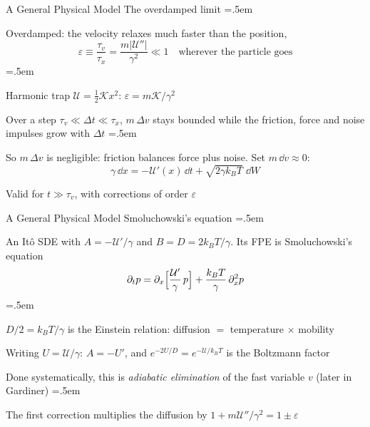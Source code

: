 \documentclass[xcolor={dvipsnames},t]{beamer}
\let\olditemize=\itemize
\let\endolditemize=\enditemize
\renewenvironment{itemize}{\olditemize \itemsep=.5em }{\endolditemize}
\newcommand{\cU}{\mathcal{U}}
\begin{document}
\begin{frame}{A General Physical Model}
    \alert{The overdamped limit}
    \begin{itemize}
        \item<2-> Overdamped: the velocity relaxes much faster than the position,
        \[ \varepsilon\equiv\frac{\tau_v}{\tau_x}=\frac{m|\cU''|}{\gamma^2}\ll1\quad\text{wherever the particle goes} \]
        \vspace{-1.5em}
        \begin{itemize}
            \item<3-> Harmonic trap $\cU=\tfrac12\mathcal Kx^2$: $\varepsilon=m\mathcal K/\gamma^2$
        \end{itemize}
        \item<4-> Over a step $\tau_v\ll\Delta t\ll\tau_x$, $m\,\Delta v$ stays bounded while the friction, force and noise impulses grow with $\Delta t$
        \begin{itemize}
            \item<5-> So $m\,\Delta v$ is negligible: friction balances force plus noise. Set $m\,\dd v\approx0$:
            \[ \gamma\,\dd x = -\cU'(x)\,\dd t + \sqrt{2\gamma k_BT}\;\dd W \]
        \end{itemize}
        \vspace{-1.5em}
        \item<6-> Valid for $t\gg\tau_v$, with corrections of order $\varepsilon$
    \end{itemize}
\end{frame}

\begin{frame}{A General Physical Model}
    \alert{Smoluchowski's equation}
    \begin{itemize}
        \item<2-> An It\^o SDE with $A=-\cU'/\gamma$ and $B=D=2k_BT/\gamma$. Its FPE is Smoluchowski's equation
        \[ \partial_tp = \partial_x\Bigl[\frac{\cU'}{\gamma}\,p\Bigr] + \frac{k_BT}{\gamma}\,\partial_x^2p \]
        \vspace{-1.5em}
        \begin{itemize}
            \item<3-> $D/2 = k_BT/\gamma$ is the Einstein relation: diffusion $=$ temperature $\times$ mobility
            \item<4-> Writing $U=\cU/\gamma$: $A=-U'$, and $e^{-2U/D}=e^{-\cU/k_BT}$ is the Boltzmann factor
        \end{itemize}
        \item<5-> Done systematically, this is \textit{adiabatic elimination} of the fast variable $v$ (later in Gardiner)
        \begin{itemize}
            \item<6-> The first correction multiplies the diffusion by $1+m\cU''/\gamma^2=1\pm\varepsilon$
        \end{itemize}
    \end{itemize}
\end{frame}
\end{document}
